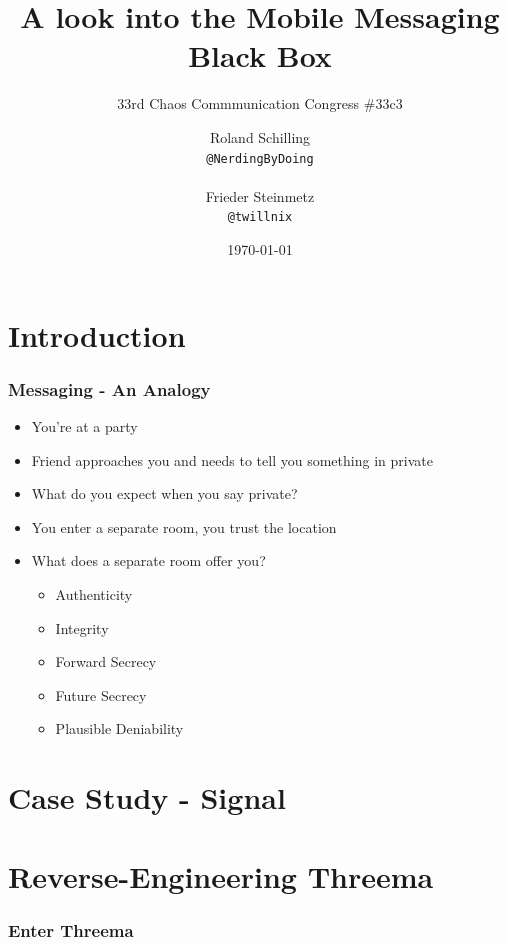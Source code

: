 \documentclass[10pt]{beamer}
\title{A look into the Mobile Messaging Black Box}
\subtitle{\scriptsize{33rd Chaos Commmunication Congress \#33c3}}
\date{\today}
\author{
	\parbox[t]{1.1in}{Roland Schilling}{\scriptsize{\texttt{@NerdingByDoing}}}\\
	\parbox[t]{1.1in}{Frieder Steinmetz}{\scriptsize{\texttt{@twillnix}}}
}
\institute{Hamburg University of Technology\\
Security in Distributed Applications}
\begin{document}
\maketitle

\section{Introduction}

\begin{frame}
	\frametitle{Messaging - An Analogy}
	\begin{itemize}
		\item You're at a party
		\item Friend approaches you and needs to tell you something \alert{in private}
		\item What do you expect when you say \alert{private}?
		\item You enter a separate room, you trust the location
		\item What does a separate room offer you?
			\begin{itemize}
				\item Authenticity
				\item Integrity
				\item Forward Secrecy
				\item Future Secrecy
				\item Plausible Deniability
			\end{itemize}
	\end{itemize}
\end{frame}

\section{Case Study - Signal}

\section{Reverse-Engineering Threema}

\begin{frame}
	\frametitle{Enter Threema}
	
\end{frame}
\end{document}
